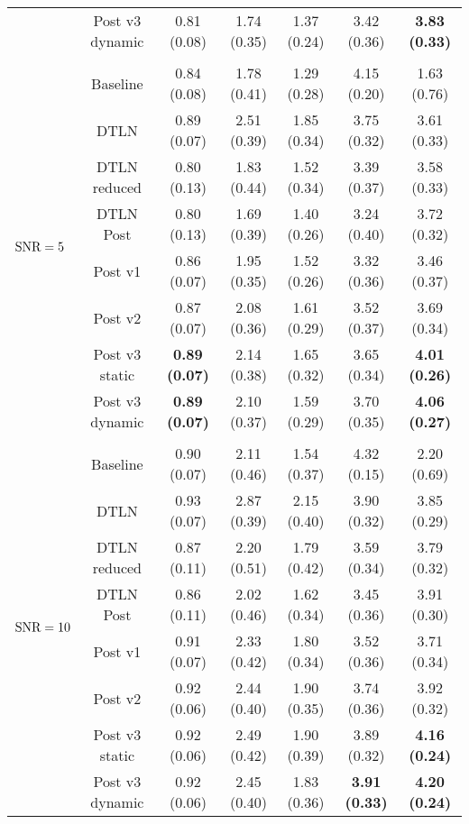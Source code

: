 \begin{table}[h]
\begin{tabular}{l c c c c c c}
				&Post v3 dynamic        & 0.81 (0.08)   & 1.74 (0.35)   & 1.37 (0.24)   & 3.42 (0.36)   & \textbf{3.83 (0.33)} \\
				&&&&&&\\
				\multirow{8}{*}{$\text{SNR}=5$}         &Baseline       & 0.84 (0.08)   & 1.78 (0.41)   & 1.29 (0.28)   & 4.15 (0.20)   & 1.63 (0.76) \\
				&DTLN   & 0.89 (0.07)   & 2.51 (0.39)   & 1.85 (0.34)   & 3.75 (0.32)   & 3.61 (0.33) \\
				&DTLN reduced   & 0.80 (0.13)   & 1.83 (0.44)   & 1.52 (0.34)   & 3.39 (0.37)   & 3.58 (0.33) \\
				&DTLN Post      & 0.80 (0.13)   & 1.69 (0.39)   & 1.40 (0.26)   & 3.24 (0.40)   & 3.72 (0.32) \\
				&Post v1        & 0.86 (0.07)   & 1.95 (0.35)   & 1.52 (0.26)   & 3.32 (0.36)   & 3.46 (0.37) \\
				&Post v2        & 0.87 (0.07)   & 2.08 (0.36)   & 1.61 (0.29)   & 3.52 (0.37)   & 3.69 (0.34) \\
				&Post v3 static & \textbf{0.89 (0.07)}   & 2.14 (0.38)   & 1.65 (0.32)   & 3.65 (0.34)   & \textbf{4.01 (0.26)} \\
				&Post v3 dynamic        & \textbf{0.89 (0.07)}   & 2.10 (0.37)   & 1.59 (0.29)   & 3.70 (0.35)   & \textbf{4.06 (0.27)} \\
				&&&&&&\\
				\multirow{8}{*}{$\text{SNR}=10$}        &Baseline       & 0.90 (0.07)   & 2.11 (0.46)   & 1.54 (0.37)   & 4.32 (0.15)   & 2.20 (0.69) \\
				&DTLN   & 0.93 (0.07)   & 2.87 (0.39)   & 2.15 (0.40)   & 3.90 (0.32)   & 3.85 (0.29) \\
				&DTLN reduced   & 0.87 (0.11)   & 2.20 (0.51)   & 1.79 (0.42)   & 3.59 (0.34)   & 3.79 (0.32) \\
				&DTLN Post      & 0.86 (0.11)   & 2.02 (0.46)   & 1.62 (0.34)   & 3.45 (0.36)   & 3.91 (0.30) \\
				&Post v1        & 0.91 (0.07)   & 2.33 (0.42)   & 1.80 (0.34)   & 3.52 (0.36)   & 3.71 (0.34) \\
				&Post v2        & 0.92 (0.06)   & 2.44 (0.40)   & 1.90 (0.35)   & 3.74 (0.36)   & 3.92 (0.32) \\
				&Post v3 static & 0.92 (0.06)   & 2.49 (0.42)   & 1.90 (0.39)   & 3.89 (0.32)   & \textbf{4.16 (0.24)} \\
				&Post v3 dynamic        & 0.92 (0.06)   & 2.45 (0.40)   & 1.83 (0.36)   & \textbf{3.91 (0.33)}   & \textbf{4.20 (0.24)} \\

\end{tabular}
\end{table}

